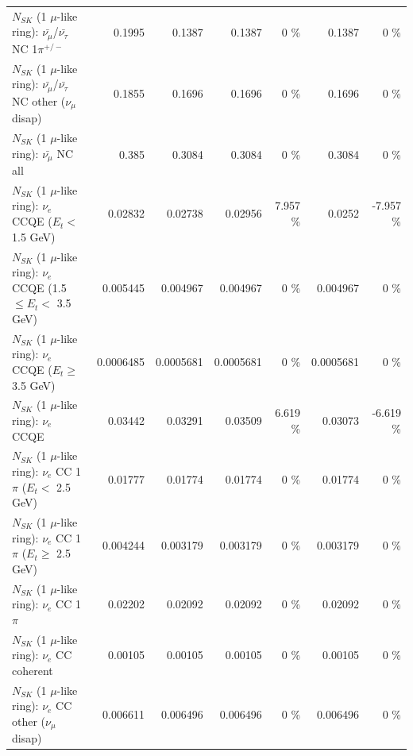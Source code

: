 \begin{table}
\begin{tabular}{| l | r | r | r  r | r  r |}
\hline
  $N_{SK}$ (1 $\mu$-like ring): $\bar{\nu_\mu}$/$\bar{\nu_\tau}$ NC 1$\pi^{+/-}$ &          0.1995 &          0.1387 &          0.1387 &        0 \%  &          0.1387 &        0 \%  \\ 
$N_{SK}$ (1 $\mu$-like ring): $\bar{\nu_\mu}$/$\bar{\nu_\tau}$ NC other ($\nu_\mu$ disap) &          0.1855 &          0.1696 &          0.1696 &        0 \%  &          0.1696 &        0 \%  \\ 
                          $N_{SK}$ (1 $\mu$-like ring): $\bar{\nu_{\mu}}$ NC all &           0.385 &          0.3084 &          0.3084 &        0 \%  &          0.3084 &        0 \%  \\ 
\hline
\hline
\hline
                  $N_{SK}$ (1 $\mu$-like ring): $\nu_e$ CCQE ($E_{t} <$ 1.5 GeV) &         0.02832 &         0.02738 &         0.02956 &    7.957 \%  &          0.0252 &   -7.957 \%  \\ 
         $N_{SK}$ (1 $\mu$-like ring): $\nu_e$ CCQE (1.5 $\leq E_{t} <$ 3.5 GeV) &        0.005445 &        0.004967 &        0.004967 &        0 \%  &        0.004967 &        0 \%  \\ 
               $N_{SK}$ (1 $\mu$-like ring): $\nu_e$ CCQE ($E_{t} \geq$ 3.5 GeV) &       0.0006485 &       0.0005681 &       0.0005681 &        0 \%  &       0.0005681 &        0 \%  \\ 
\hline
                                      $N_{SK}$ (1 $\mu$-like ring): $\nu_e$ CCQE &         0.03442 &         0.03291 &         0.03509 &    6.619 \%  &         0.03073 &   -6.619 \%  \\ 
\hline
             $N_{SK}$ (1 $\mu$-like ring): $\nu_e$ CC 1$\pi$ ($E_{t} <$ 2.5 GeV) &         0.01777 &         0.01774 &         0.01774 &        0 \%  &         0.01774 &        0 \%  \\ 
          $N_{SK}$ (1 $\mu$-like ring): $\nu_e$ CC 1$\pi$ ($E_{t} \geq$ 2.5 GeV) &        0.004244 &        0.003179 &        0.003179 &        0 \%  &        0.003179 &        0 \%  \\ 
\hline
                                 $N_{SK}$ (1 $\mu$-like ring): $\nu_e$ CC 1$\pi$ &         0.02202 &         0.02092 &         0.02092 &        0 \%  &         0.02092 &        0 \%  \\ 
                               $N_{SK}$ (1 $\mu$-like ring): $\nu_e$ CC coherent &         0.00105 &         0.00105 &         0.00105 &        0 \%  &         0.00105 &        0 \%  \\ 
                $N_{SK}$ (1 $\mu$-like ring): $\nu_e$ CC other ($\nu_\mu$ disap) &        0.006611 &        0.006496 &        0.006496 &        0 \%  &        0.006496 &        0 \%  \\ 

\end{tabular}
\end{table}
